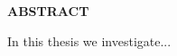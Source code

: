 \newpage
{}

\begin{center}
  \MakeUppercase{\@title}\\
  \bigskip
  \MakeUppercase{\@author}\\
  \bigskip
  \textbf{ABSTRACT}
\end{center}

\bigskip

In this thesis we investigate...

\vfill